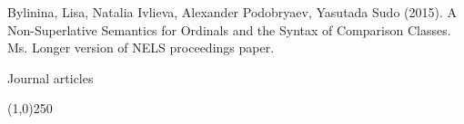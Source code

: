 \documentclass[12pt,letterpaper]{article}
\begin{document}
{\begin{hangparas}{.25in}{1}
Bylinina, Lisa, Natalia Ivlieva, Alexander Podobryaev, Yasutada Sudo (2015). A Non-Superlative Semantics for Ordinals and the Syntax of Comparison Classes. Ms. Longer version of NELS proceedings paper.

%

\vspace{1mm}


\end{hangparas}
}

\vspace{5mm}


\noindent \Large{Journal articles}

\vspace{-4mm}
\noindent\line(1,0){250}
\end{document}

